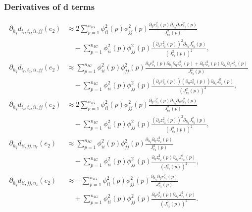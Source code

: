 \documentclass{article}
\begin{document}
\subsubsection{Derivatives of d terms}
\begin{align}
\partial_{h_q} d_{t_r,t_r,ii,jj}(e_2) &\approx 2 \sum_{p=1}^{n_{IG}} \phi_{ii}^2(p) \phi_{jj}^2(p) \frac{ \partial_\eta r_{e_2}^2(p) \partial_{h_q} \partial_\eta r_{e_2}^2(p) }{ J_{e_2}^2(p) } \nonumber\\
&\quad - \sum_{p=1}^{n_{IG}} \phi_{ii}^2(p) \phi_{jj}^2(p) \frac{ (\partial_\eta r_{e_2}^2(p))^2 \partial_{h_q} J_{e_2}^2(p) }{ (J_{e_2}^2(p))^2 }, \tag{21.113}\\
\partial_{h_q} d_{t_r,t_z,ii,jj}(e_2) &\approx \sum_{p=1}^{n_{IG}} \phi_{ii}^2(p) \phi_{jj}^2(p) \frac{ \partial_\eta r_{e_2}^2(p) \partial_{h_q} \partial_\eta z_{e_2}^2(p) + \partial_\eta z_{e_2}^2(p) \partial_{h_q} \partial_\eta r_{e_2}^2(p) }{ J_{e_2}^2(p) } \nonumber\\
&\quad - \sum_{p=1}^{n_{IG}} \phi_{ii}^2(p) \phi_{jj}^2(p) \frac{ (\partial_\eta r_{e_2}^2(p)) (\partial_\eta z_{e_2}^2(p)) \partial_{h_q} J_{e_2}^2(p) }{ (J_{e_2}^2(p))^2 }, \tag{21.116}\\
\partial_{h_q} d_{t_z,t_z,ii,jj}(e_2) &\approx 2 \sum_{p=1}^{n_{IG}} \phi_{ii}^2(p) \phi_{jj}^2(p) \frac{ \partial_\eta z_{e_2}^2(p) \partial_{h_q} \partial_\eta z_{e_2}^2(p) }{ J_{e_2}^2(p) } \nonumber\\
&\quad - \sum_{p=1}^{n_{IG}} \phi_{ii}^2(p) \phi_{jj}^2(p) \frac{ (\partial_\eta z_{e_2}^2(p))^2 \partial_{h_q} J_{e_2}^2(p) }{ (J_{e_2}^2(p))^2 }, \tag{21.119}\\
\partial_{h_q} d_{ii,jj,n_r}(e_2) &\approx \sum_{p=1}^{n_{IG}} \phi_{ii}^2(p) \phi_{jj}^2(p) \frac{ \partial_{h_q} \partial_\eta z_{e_2}^2(p) }{ J_{e_2}^2(p) } \nonumber\\
&\quad - \sum_{p=1}^{n_{IG}} \phi_{ii}^2(p) \phi_{jj}^2(p) \frac{ \partial_\eta z_{e_2}^2(p) \partial_{h_q} J_{e_2}^2(p) }{ (J_{e_2}^2(p))^2 }, \tag{21.122}\\
\partial_{h_q} d_{ii,jj,n_z}(e_2) &\approx - \sum_{p=1}^{n_{IG}} \phi_{ii}^2(p) \phi_{jj}^2(p) \frac{ \partial_{h_q} \partial_\eta r_{e_2}^2(p) }{ J_{e_2}^2(p) } \nonumber\\
&\quad + \sum_{p=1}^{n_{IG}} \phi_{ii}^2(p) \phi_{jj}^2(p) \frac{ \partial_\eta r_{e_2}^2(p) \partial_{h_q} J_{e_2}^2(p) }{ (J_{e_2}^2(p))^2 }. \tag{21.125}
\end{align}
\end{document}
